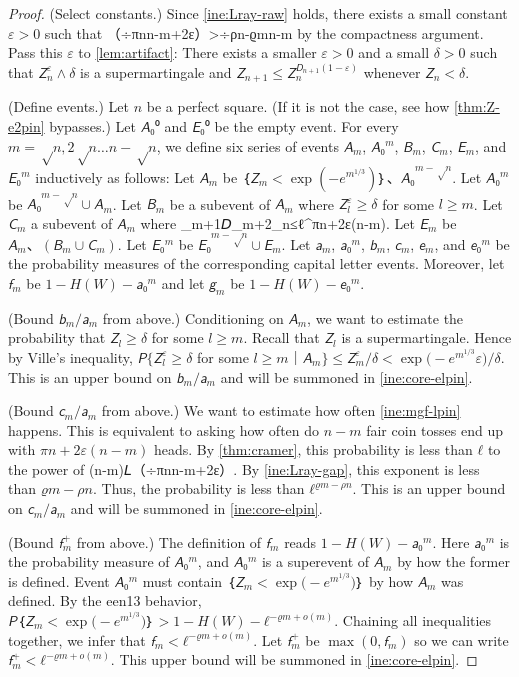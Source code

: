 \documentclass[openany]{amsbook}
\makeatletter
\numberwithin{equation}{chapter}
\numberwithin{figure}{chapter}
\numberwithin{table}{chapter}
\def\bigl@C#1{\bigl#1}					\def\bigr@C#1{\bigr#1}
\def\({\bigl@C(}	\def\){\bigr@C)}	令（{\Bigl(}			令）{\Bigr)}
\def\[#1\]{\begin{equation*}{#1}\end{equation*}}
\theoremstyle{definition}	理dfn:Definition~?s			理exa:Example~?s
\theoremstyle{remark}		理cla:Claim~?s				理rem:Remark~?s
\makeatother
\begin{document}
	\begin{proof}
		(Select constants.)
		Since \cref{ine:Lray-raw} holds, there exists a small constant $ε>0$ such that
		\[𝘓（÷{πn}{n-m}+2ε）>÷{ρn-ϱm}{n-m}\label{ine:Lray-gap}\]
		by the compactness argument.
		Pass this $ε$ to \cref{lem:artifact}:
		There exists a smaller $ε>0$ and a small $δ>0$ such that $𝘡_n^ε∧δ$ is
		a supermartingale and $𝘡_{n+1}≤𝘡_n^{𝘋_{n+1}(1-ε)}$ whenever $𝘡_n<δ$.
		
		(Define events.)
		Let $n$ be a perfect square.
		(If it is not the case, see how \cref{thm:Z-e2pin} bypasses.)
		Let $𝘈₀⁰$ and $𝘌₀⁰$ be the empty event.
		For every $m=√n,2√n…n-√n$, we define six series of events
		$𝘈_m$, $𝘈₀^m$, $𝘉_m$, $𝘊_m$, $𝘌_m$, and $𝘌₀^m$
		inductively as follows:
		Let $𝘈_m$ be $｛𝘡_m<\exp(-e^{m^{1/3}})｝、𝘈₀^{m-√n}$.
		Let $𝘈₀^m$ be $𝘈₀^{m-√n}∪𝘈_m$.
		Let $𝘉_m$ be a subevent of $𝘈_m$ where $𝘡_l^ε≥δ$ for some $l≥m$.
		Let $𝘊_m$ a subevent of $𝘈_m$ where
		\[𝘋_{m+1}𝘋_{m+2}_n≤ℓ^{πn+2ε(n-m)}.\label{ine:mgf-lpin}\]
		Let $𝘌_m$ be $𝘈_m、(𝘉_m∪𝘊_m)$.
		Let $𝘌₀^m$ be $𝘌₀^{m-√n}∪𝘌_m$.
		Let $𝘢_m$, $𝘢₀^m$, $𝘣_m$, $𝘤_m$, $𝘦_m$, and $𝘦₀^m$
		be the probability measures of the corresponding capital letter events.
		Moreover, let $𝘧_m$ be $1-H(W)-𝘢₀^m$ and let $𝘨_m$ be $1-H(W)-𝘦₀^m$.
		
		(Bound $𝘣_m/𝘢_m$ from above.)
		Conditioning on $𝘈_m$, we want to estimate
		the probability that $𝘡_l≥δ$ for some $l≥m$.
		Recall that $𝘡_l$ is a supermartingale.
		Hence by Ville's inequality,
		$𝘗\{𝘡_l^ε≥δ$ for some $l≥m｜𝘈_m\}≤𝘡_m^ε/δ<\exp\(-e^{m^{1/3}}ε\)/δ$.
		This is an upper bound on $𝘣_m/𝘢_m$
		and will be summoned in \cref{ine:core-elpin}.
		
		(Bound $𝘤_m/𝘢_m$ from above.)
		We want to estimate how often \cref{ine:mgf-lpin} happens.
		This is equivalent to asking how often do $n-m$
		fair coin tosses end up with $πn+2ε(n-m)$ heads.
		By \cref{thm:cramer}, this probability is less than $ℓ$ to the power of
		\[-(n-m)𝘓（÷{πn}{n-m}+2ε）.\]
		By \cref{ine:Lray-gap}, this exponent is less than $ϱm-ρn$.
		Thus, the probability is less than $ℓ^{ϱm-ρn}$.
		This is an upper bound on $𝘤_m/𝘢_m$
		and will be summoned in \cref{ine:core-elpin}.
		
		(Bound $𝘧_m^+$ from above.)
		The definition of $𝘧_m$ reads $1-H(W)-𝘢₀^m$.
		Here $𝘢₀^m$ is the probability measure of $𝘈₀^m$,
		and $𝘈₀^m$ is a superevent of $𝘈_m$ by how the former is defined.
		Event $𝘈₀^m$ must contain $｛𝘡_m<\exp\(-e^{m^{1/3}}\)｝$
		by how $𝘈_m$ was defined.
		By the een13 behavior, $𝘗｛𝘡_m<\exp\(-e^{m^{1/3}}\)｝>1-H(W)-ℓ^{-ϱm+o(m)}$.
		Chaining all inequalities together, we infer that $𝘧_m<ℓ^{-ϱm+o(m)}$.
		Let $𝘧_m^+$ be $\max(0,𝘧_m)$ so
		we can write $𝘧_m^+<ℓ^{-ϱm+o(m)}$.
		This upper bound will be summoned in \cref{ine:core-elpin}.
		

\end{proof}
\end{document}
